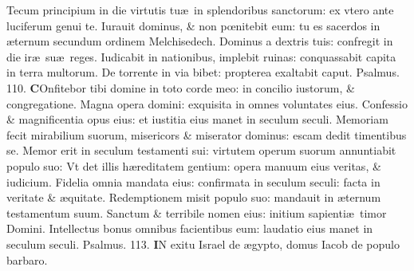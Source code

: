 \documentclass[a5paper,10pt]{book}
\def\ae{æ}
\def\oe{œ}
\begin{document}
\begin{multicols*}{2}
\newline \color{red} T\color{black}ecum principium in die virtutis tu\ae \ in splendoribus sanctorum: ex vtero ante luciferum genui te.
\newline \color{red} I\color{black}urauit dominus, \& non p\oe nitebit eum: tu es sacerdos in \ae ternum secundum ordinem Melchisedech.
\newline \color{red} D\color{black}ominus a dextris tuis: confregit in die ir\ae \ su\ae \ reges.
\newline \color{red} I\color{black}udicabit in nationibus, implebit ruinas: conquassabit capita in terra multorum.
\newline \color{red} D\color{black}e torrente in via bibet: propterea exaltabit caput. \quad \color{red} Psalmus. \hypertarget{ps110}{110.} \color{black}
\vspace{-.5em}
\lettrine[lines=2]{\bfseries \color{red} C}{}Onfitebor tibi domine in toto corde meo: in concilio iustorum, \& congregatione.%
\newline \color{red} M\color{black}agna opera domini: exquisita in omnes voluntates eius.
\newline \color{red} C\color{black}onfessio \& magnificentia opus eius: et iustitia eius manet in seculum seculi.
\newline \color{red} M\color{black}emoriam fecit mirabilium suorum, misericors \& miserator dominus: escam dedit timentibus se.
\newline \color{red} M\color{black}emor erit in seculum testamenti sui: virtutem operum suorum annuntiabit populo suo:
\newline \color{red} V\color{black}t det illis h\ae reditatem gentium: opera manuum eius veritas, \& iudicium.
\newline \color{red} F\color{black}idelia omnia mandata eius: confirmata in seculum seculi: facta in veritate \& \ae quitate.
\newline \color{red} R\color{black}edemptionem misit populo suo: mandauit in \ae ternum testamentum suum.
\newline \color{red} S\color{black}anctum \& terribile nomen eius: initium sapienti\ae \ timor Domini.
\newline \color{red} I\color{black}ntellectus bonus omnibus facientibus eum: laudatio eius manet in seculum seculi. \quad \color{red} Psalmus. \hypertarget{ps113}{113.} \color{black}
\vspace{-.5em}
\lettrine[lines=2]{\bfseries \color{red} I}{}N exitu Israel de \ae gypto, domus Iacob de populo barbaro.

\end{multicols*}
\end{document}
